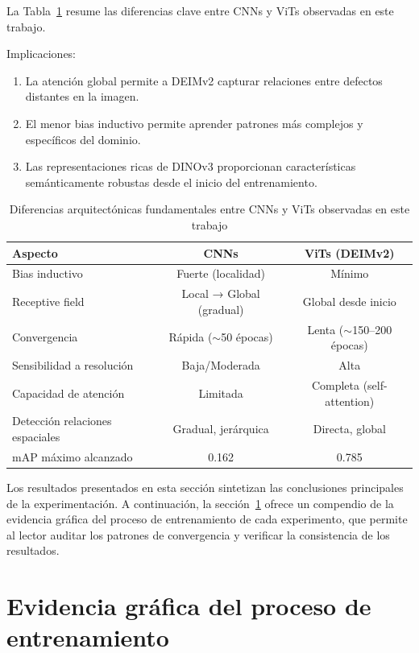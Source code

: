 La Tabla~\ref{tab:diferencias_arquitectonicas} resume las diferencias clave entre CNNs y ViTs observadas en este trabajo.

Implicaciones:
\begin{enumerate}
    \item La atención global permite a DEIMv2 capturar relaciones entre defectos distantes en la imagen.
    \item El menor bias inductivo permite aprender patrones más complejos y específicos del dominio.
    \item Las representaciones ricas de DINOv3 proporcionan características semánticamente robustas desde el inicio del entrenamiento.
\end{enumerate}

\begin{table}[htbp]
\centering
\begin{tabular}{lcc}
\toprule
\textbf{Aspecto} & \textbf{CNNs} & \textbf{ViTs (DEIMv2)} \\
\midrule
Bias inductivo & Fuerte (localidad) & Mínimo \\
Receptive field & Local → Global (gradual) & Global desde inicio \\
Convergencia & Rápida ($\sim$50 épocas) & Lenta ($\sim$150--200 épocas) \\
Sensibilidad a resolución & Baja/Moderada & Alta \\
Capacidad de atención & Limitada & Completa (self-attention) \\
Detección relaciones espaciales & Gradual, jerárquica & Directa, global \\
mAP máximo alcanzado & 0.162 & 0.785 \\
\bottomrule
\end{tabular}
\caption{Diferencias arquitectónicas fundamentales entre CNNs y ViTs observadas en este trabajo}
\label{tab:diferencias_arquitectonicas}
\end{table}

Los resultados presentados en esta sección sintetizan las conclusiones principales de la experimentación. A continuación, la sección~\ref{sec:evidencia_grafica} ofrece un compendio de la evidencia gráfica del proceso de entrenamiento de cada experimento, que permite al lector auditar los patrones de convergencia y verificar la consistencia de los resultados.

\FloatBarrier
\clearpage
\section{Evidencia gráfica del proceso de entrenamiento}
\label{sec:evidencia_grafica}

